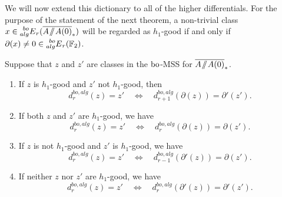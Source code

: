 We will now extend this dictionary to all of the higher differentials. For the purpose of the statement of the next theorem, a non-trivial class $x \in \E{bo}{alg}_r(\AA0)$ will be regarded as $h_1$-good if and only if $\partial(x) \ne 0 \in \prescript{bo}{alg}{E}_r(\mathbb{F}_2)$.

\begin{thm}\label{thm:AA0}
Suppose that $z$ and $z'$ are classes in the $\mathrm{bo}$-MSS for $\AA0$.   \begin{enumerate}

\item
If $z$ is $h_1$-good and $z'$ not $h_1$-good, then 
$$ d^{bo, alg}_r (z) = z' \quad \Leftrightarrow \quad d^{bo,alg}_{r+1}(\partial(z)) = \partial'(z'). $$

\item
If both $z$ and $z'$ are $h_1$-good, we have
$$ d_r^{bo,alg}(z) = z'  \quad \Leftrightarrow \quad d^{bo,alg}_r(\partial(z)) = \partial(z'). $$ 

\item 
If $z$ is not $h_1$-good and $z'$ is $h_1$-good, we have
$$ d_{r}^{bo,alg}(z) = z' \quad \Leftrightarrow \quad d_{r-1}^{bo,alg}(\partial'(z)) = \partial(z'). $$

\item
If neither $z$ nor $z'$ are $h_1$-good, we have
$$ d_r^{bo,alg}(z) = z'  \quad \Leftrightarrow \quad d^{bo,alg}_r(\partial'(z)) = \partial'(z'). $$ 
\end{enumerate}
\end{thm}

